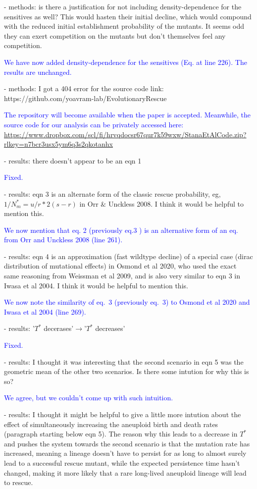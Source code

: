 \documentclass[12pt]{extarticle}
\begin{document}
- methods: is there a justification for not including density-dependence for the sensitives as well? This would hasten their initial decline, which would compound with the reduced initial establishment probability of the mutants. It seems odd they can exert competition on the mutants but don't themselves feel any competition.

\textcolor{blue}{We have now added density-dependence for the sensitives (Eq. at line 226). The results are unchanged.}

- methods: I got a 404 error for the source code link: https://github.com/yoavram-lab/EvolutionaryRescue

\textcolor{blue}{
The repository will become available when the paper is accepted. Meanwhile, the source code for our analysis can be privately accessed here: \url{https://www.dropbox.com/scl/fi/hrvqdocsr67qur7k59wxw/StanaEtAlCode.zip?rlkey=n7bcr3usx5ym6q3s2qkotanhx}
}

- results: there doesn't appear to be an eqn 1

\textcolor{blue}{Fixed.} %

- results: eqn 3 is an alternate form of the classic rescue probability, eg, $1/N_m^*=u/r*2(s-r)$ in Orr $\&$ Unckless 2008. I think it would be helpful to mention this.

\textcolor{blue}{ %
We now mention that eq. 2 (previously eq.3 ) is an alternative form of an eq. from Orr and Unckless 2008 (line 261).
} 

- results: eqn 4 is an approximation (fast wildtype decline) of a special case (dirac distribution of mutational effects) in Osmond et al 2020, who used the exact same reasoning from Weissman et al 2009, and is also very similar to eqn 3 in Iwasa et al 2004. I think it would be helpful to mention this.

\textcolor{blue}{%
We now note the similarity of eq.~3 (previously eq.~3) to Osmond et al 2020 and Iwasa et al 2004 (line 269).
} 

- results: '$T^*$ decerases'$\rightarrow$'$T^*$ decreases'

\textcolor{blue}{Fixed.} %

- results: I thought it was interesting that the second scenario in eqn 5 was the geometric mean of the other two scenarios. Is there some intution for why this is so?

\textcolor{blue}{We agree, but we couldn't come up with such intuition.} 

- results: I thought it might be helpful to give a little more intution about the effect of simultaneously increasing the aneuploid birth and death rates (paragraph starting below eqn 5). The reason why this leads to a decrease in $T^*$ and pushes the system towards the second scenario is that the mutation rate has increased, meaning a lineage doesn't have to persist for as long to almost surely lead to a successful rescue mutant, while the expected persistence time hasn't changed, making it more likely that a rare long-lived aneuploid lineage will lead to rescue.
\end{document}
